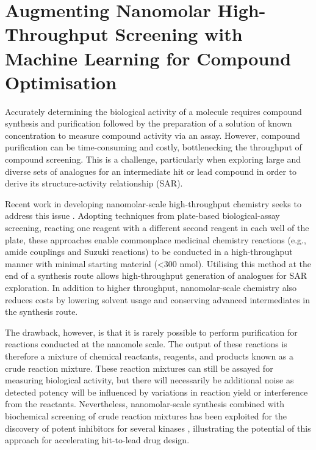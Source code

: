 \chapter{Augmenting Nanomolar High-Throughput Screening with Machine Learning for Compound Optimisation} \label{ch:testing}

Accurately determining the biological activity of a molecule requires compound synthesis and purification followed by the preparation of a solution of known concentration to measure compound activity via an assay. However, compound purification can be time-consuming and costly, bottlenecking the throughput of compound screening. This is a challenge, particularly when exploring large and diverse sets of analogues for an intermediate hit or lead compound in order to derive its structure-activity relationship (SAR).

Recent work in developing nanomolar-scale high-throughput chemistry seeks to address this issue \cite{Santarilla2015MerckNanomolar, Perera2018PfizerNanomolar, Gehrtz2022nanomolar}. Adopting techniques from plate-based biological-assay screening, reacting one reagent with a different second reagent in each well of the plate, these approaches enable commonplace medicinal chemistry reactions (e.g., amide couplings and Suzuki reactions) to be conducted in a high-throughput manner with minimal starting material (<300 nmol). Utilising this method at the end of a synthesis route allows high-throughput generation of analogues for SAR exploration. In addition to higher throughput, nanomolar-scale chemistry also reduces costs by lowering solvent usage and conserving advanced intermediates in the synthesis route. 

The drawback, however, is that it is rarely possible to perform purification for reactions conducted at the nanomole scale. The output of these reactions is therefore a mixture of chemical reactants, reagents, and products known as a crude reaction mixture. These reaction mixtures can still be assayed for measuring biological activity, but there will necessarily be additional noise as detected potency will be influenced by variations in reaction yield or interference from the reactants. Nevertheless, nanomolar-scale synthesis combined with biochemical screening of crude reaction mixtures has been exploited for the discovery of potent inhibitors for several kinases \cite{Gesmundo2018nanosar, Gehrtz2022nanomolar}, illustrating the potential of this approach for accelerating hit-to-lead drug design.

